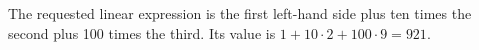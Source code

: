 The requested linear expression is the first left-hand side plus ten times the second plus 100 times the third. Its value is $1+10\cdot2+100\cdot9=\boxed{921}$.
